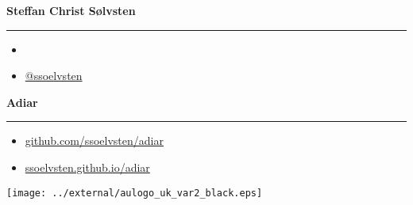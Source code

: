 \begin{frame}
  {\Large \textbf{Steffan Christ Sølvsten}}
  \vspace{1pt} {\hrule width0.45\linewidth}

  \vspace{5pt}

  \begin{itemize}
  \item[\faIcon{envelope}] 
  \item[\faIcon{twitter}] \href{https://www.twitter.com/ssoelvsten}{@ssoelvsten}
  \end{itemize}

  \vspace{10pt}

  {\Large \textbf{Adiar}}
  \vspace{1pt} {\hrule width0.45\linewidth}

  \vspace{5pt}

  \begin{itemize}
  \item[\faIcon{code}]
    \href{http://github.com/ssoelvsten/adiar}{github.com/ssoelvsten/adiar}
  \item[\faIcon{book}\hspace{2pt}]
    \href{http://ssoelvsten.github.io/adiar}{ssoelvsten.github.io/adiar}
  \end{itemize}


  \vspace{10pt}

  \texttt{[image: ../external/aulogo\_uk\_var2\_black.eps]}
\end{frame}